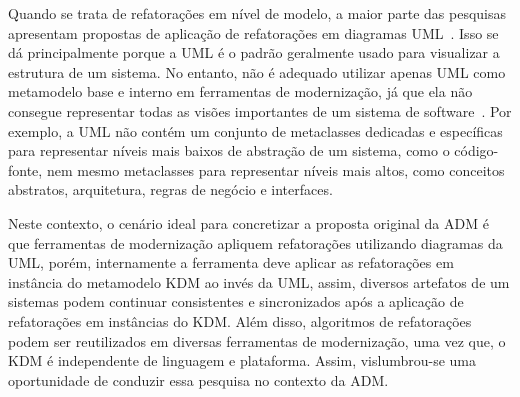 Quando se trata de refatorações em nível de modelo, a maior parte das pesquisas apresentam propostas de aplicação de refatorações em diagramas UML~\cite{Salem_2008, Gorp, Egyed_2008, Briand_2006, staron2004implementing, revisao_sistematica_uml_refactoring}. Isso se dá principalmente porque a UML é o padrão geralmente usado para visualizar a estrutura de um sistema. No entanto, não é adequado utilizar apenas UML como metamodelo base e interno em ferramentas de modernização, já que ela não consegue representar todas as visões importantes de um sistema de software~\cite{Gorp, KolahdouzRahimi20145, revisao_sistematica_uml_refactoring, durelli_systematic_mapping}. Por exemplo, a UML não contém um conjunto de metaclasses dedicadas e específicas para representar níveis mais baixos de abstração de um sistema, como o código-fonte, nem mesmo metaclasses para representar níveis mais altos, como conceitos abstratos, arquitetura, regras de negócio e interfaces.

%
%


Neste contexto, o cenário ideal para concretizar a proposta original da ADM é que ferramentas de modernização apliquem refatorações utilizando diagramas da UML, porém, internamente a ferramenta deve aplicar as refatorações em instância do metamodelo KDM ao invés da UML, assim, diversos artefatos de um sistemas podem continuar consistentes e sincronizados após a aplicação de refatorações em instâncias do KDM. Além disso, algoritmos de refatorações podem ser reutilizados em diversas ferramentas de modernização, uma vez que, o KDM é independente de linguagem e plataforma. Assim, vislumbrou-se uma oportunidade de conduzir essa pesquisa no contexto da ADM. 







